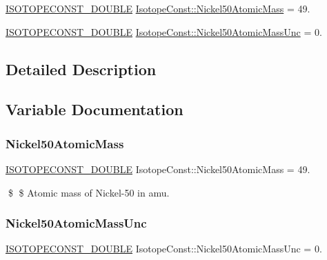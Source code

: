 \begin{DoxyCompactItemize}
\item 
\mbox{\hyperlink{group___isotope_const-_macros_ga8f45a7272ce02c0b4c65c44636ed719a}{I\+S\+O\+T\+O\+P\+E\+C\+O\+N\+S\+T\+\_\+\+D\+O\+U\+B\+LE}} \mbox{\hyperlink{group___isotope_const-_nickel-_ni50_gaae24a7f9964d89a39fde3e32c7787d69}{Isotope\+Const\+::\+Nickel50\+Atomic\+Mass}} = 49.
\item 
\mbox{\hyperlink{group___isotope_const-_macros_ga8f45a7272ce02c0b4c65c44636ed719a}{I\+S\+O\+T\+O\+P\+E\+C\+O\+N\+S\+T\+\_\+\+D\+O\+U\+B\+LE}} \mbox{\hyperlink{group___isotope_const-_nickel-_ni50_gac0236d79e5a012fd16e8f6a11c77c0b7}{Isotope\+Const\+::\+Nickel50\+Atomic\+Mass\+Unc}} = 0.
\end{DoxyCompactItemize}


\subsection{Detailed Description}


\subsection{Variable Documentation}
\mbox{\label{group___isotope_const-_nickel-_ni50_gaae24a7f9964d89a39fde3e32c7787d69}} 
\subsubsection{\texorpdfstring{Nickel50\+Atomic\+Mass}{Nickel50AtomicMass}}
{\footnotesize\ttfamily \mbox{\hyperlink{group___isotope_const-_macros_ga8f45a7272ce02c0b4c65c44636ed719a}{I\+S\+O\+T\+O\+P\+E\+C\+O\+N\+S\+T\+\_\+\+D\+O\+U\+B\+LE}} Isotope\+Const\+::\+Nickel50\+Atomic\+Mass = 49.}

\$ \$ Atomic mass of Nickel-\/50 in amu. \mbox{\label{group___isotope_const-_nickel-_ni50_gac0236d79e5a012fd16e8f6a11c77c0b7}} 
\subsubsection{\texorpdfstring{Nickel50\+Atomic\+Mass\+Unc}{Nickel50AtomicMassUnc}}
{\footnotesize\ttfamily \mbox{\hyperlink{group___isotope_const-_macros_ga8f45a7272ce02c0b4c65c44636ed719a}{I\+S\+O\+T\+O\+P\+E\+C\+O\+N\+S\+T\+\_\+\+D\+O\+U\+B\+LE}} Isotope\+Const\+::\+Nickel50\+Atomic\+Mass\+Unc = 0.}

